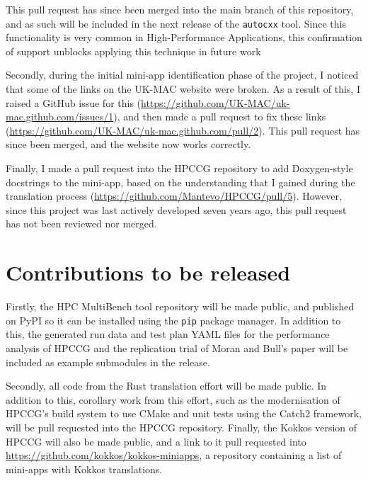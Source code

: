This pull request has since been merged into the main branch of this repository, and as such will be included in the next release of the \texttt{autocxx} tool. Since this functionality is very common in High-Performance Applications, this confirmation of support unblocks applying this technique in future work

Secondly, during the initial mini-app identification phase of the project, I noticed that some of the links on the UK-MAC website were broken. As a result of this, I raised a GitHub issue for this (\url{https://github.com/UK-MAC/uk-mac.github.com/issues/1}), and then made a pull request to fix these links (\url{https://github.com/UK-MAC/uk-mac.github.com/pull/2}). This pull request has since been merged, and the website now works correctly.

Finally, I made a pull request into the HPCCG repository to add Doxygen-style docstrings to the mini-app, based on the understanding that I gained during the translation process (\url{https://github.com/Mantevo/HPCCG/pull/5}). However, since this project was last actively developed seven years ago, this pull request has not been reviewed nor merged.

\section{Contributions to be released}
\label{ssec:open-source-to-be-released}

Firstly, the HPC MultiBench tool repository will be made public, and published on PyPI so it can be installed using the \texttt{pip} package manager. In addition to this, the generated run data and test plan YAML files for the performance analysis of HPCCG and the replication trial of Moran and Bull's paper \cite{moranEmergingTechnologiesRust2023} will be included as example submodules in the release.

Secondly, all code from the Rust translation effort will be made public. In addition to this, corollary work from this effort, such as the modernisation of HPCCG's build system to use CMake and unit tests using the Catch2 framework, will be pull requested into the HPCCG repository. Finally, the Kokkos version of HPCCG will also be made public, and a link to it pull requested into \url{https://github.com/kokkos/kokkos-miniapps}, a repository containing a list of mini-apps with Kokkos translations.

